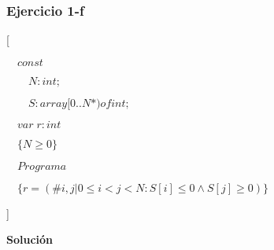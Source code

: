 \documentclass[hidelinks]{article}
\begin{document}

\subsubsection{Ejercicio 1-f}

[\par
$\quad const $\par
$\qquad N: int;$\par
$\qquad S: array[0..N*) of int;$\par
$\quad var \; r: int$\par
$\quad\{N \geq 0\}$\par
$\quad Programa $ \par
$\quad \{r = (\# i,j| 0\leq i < j < N :S[i] \leq 0 \land S[j] \geq 0)\}$ \par
]

\textbf{Solución}
\end{document}
